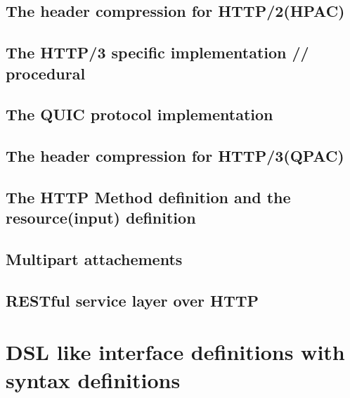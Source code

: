 \documentclass[10pt,a4paper,english]{article}
\begin{document}
\begin{multicols}{2}
\subsection{The header compression for HTTP/2(HPAC)}
\begin{flushleft}
\end{flushleft}
\subsection{The HTTP/3 specific implementation // procedural}
\begin{flushleft}
\end{flushleft}
\subsection{The QUIC protocol implementation}
\begin{flushleft}
\end{flushleft}
\subsection{The header compression for HTTP/3(QPAC)}
\begin{flushleft}
\end{flushleft}
\subsection{The HTTP Method definition and the resource(input) definition}
\begin{flushleft}
\end{flushleft}
\subsection{Multipart attachements}
\begin{flushleft}
\end{flushleft}
\subsection{RESTful service layer over HTTP }
\begin{flushleft}
\end{flushleft}
\section{DSL like interface definitions with syntax definitions}
\begin{flushleft}
\end{flushleft}

\end{multicols}
\end{document}
